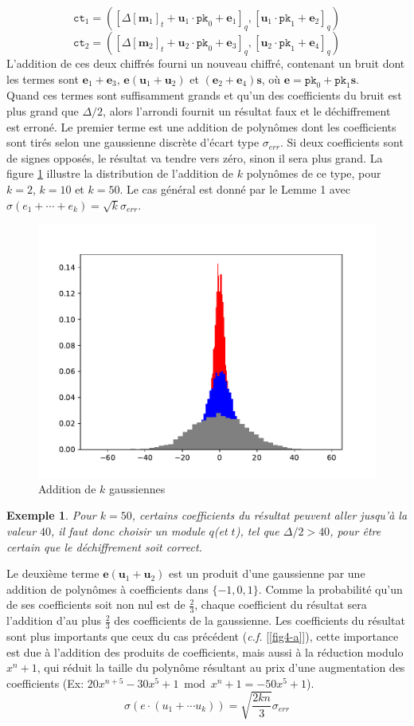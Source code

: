 \documentclass[11pt, headsepline, a4paper, fleqn, oneside]{article}
\newtheorem{ex}{Exemple}
\begin{document}
    $$\texttt{ct}_1=\left(\left[\Delta[\boldsymbol{m}_1]_{t}+\boldsymbol{u}_1 \cdot \texttt{pk}_0+\boldsymbol{e}_{1}\right]_{q},\left[\boldsymbol{u}_1 \cdot \texttt{pk}_1+\boldsymbol{e}_{2}\right]_{q}\right) $$
    $$\texttt{ct}_2=\left(\left[\Delta[\boldsymbol{m}_2]_{t}+\boldsymbol{u}_2 \cdot \texttt{pk}_0+\boldsymbol{e}_{3}\right]_{q},\left[\boldsymbol{u}_2 \cdot \texttt{pk}_1+\boldsymbol{e}_{4}\right]_{q}\right)$$
L'addition de ces deux chiffrés fourni un nouveau chiffré, contenant un bruit dont les termes sont $\boldsymbol{e}_{1} + \boldsymbol{e}_{3},\, \boldsymbol{e}(\boldsymbol{u}_{1} + \boldsymbol{u}_{2})$ et $(\boldsymbol{e}_{2} + \boldsymbol{e}_{4})\boldsymbol{s}$, où $\boldsymbol{e} = \texttt{pk}_0 + \texttt{pk}_1 \boldsymbol{s}$.\\
Quand ces termes sont suffisamment grands et qu'un des coefficients du bruit est plus grand que $\Delta /2$, alors l'arrondi fournit un résultat faux et le déchiffrement est erroné. Le premier terme est une addition de polynômes dont les coefficients sont tirés selon une gaussienne discrète d'écart type $\sigma_{err}$. Si deux coefficients sont de signes opposés, le résultat va tendre vers zéro, sinon il sera plus grand. La figure \ref{addgauss} illustre la distribution de l'addition de $k$ polynômes de ce type, pour \colorbox{red}{}$k=2$, \colorbox{blue}{}$k=10$ et \colorbox{trolleygrey}{}$k=50$. Le cas général est donné par le Lemme 1 avec $\sigma(e_1 +\cdots+e_k) = \sqrt{k}\sigma_{err}$.
\begin{figure}[ht]
    \centering
    \includegraphics[width=0.45\linewidth]{add.pdf}
    \caption{\footnotesize{Addition de $k$ gaussiennes}}
    \label{addgauss}
\end{figure}

\begin{ex}
Pour $k=50$, certains coefficients du résultat peuvent aller jusqu'à la valeur $40$, il faut donc choisir un module $q$(et $t$), tel que $\Delta/2 > 40$, pour être certain que le déchiffrement soit correct.
\end{ex}
Le deuxième terme $\boldsymbol{e}(\boldsymbol{u}_{1} + \boldsymbol{u}_{2})$ est un produit d'une gaussienne par une addition de polynômes à coefficients dans $\{-1,0,1\}$. Comme la probabilité qu'un de ses coefficients soit non nul est de $\frac{2}{3}$, chaque coefficient du résultat sera l'addition d'au plus $\frac{2}{3}$ des coefficients de la gaussienne. Les coefficients du résultat sont plus importants que ceux du cas précédent (\textit{c.f.} [\ref{fig4-a}]), cette importance est due à l'addition des produits de coefficients, mais aussi à la réduction modulo $x^n + 1$, qui réduit la taille du polynôme résultant au prix d'une augmentation des coefficients (Ex: $20x^{n+5} - 30x^5 +1 \bmod x^n +1 = -50x^5 + 1$). $$\sigma(e\cdot(u_1 + \cdots u_k)) = \sqrt{\frac{2kn}{3}}\sigma_{err}$$
\end{document}
